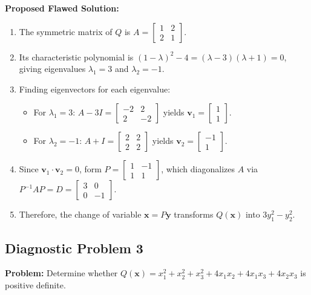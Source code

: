 \documentclass[11pt, letterpaper]{article}
\theoremstyle{definition}
\theoremstyle{remark}
\begin{document}
\textbf{Proposed Flawed Solution:}
\begin{enumerate}
    \item The symmetric matrix of $Q$ is $A = \begin{bmatrix} 1 & 2 \\ 2 & 1 \end{bmatrix}$.
    \item Its characteristic polynomial is $(1-\lambda)^2 - 4 = (\lambda - 3)(\lambda + 1) = 0$, giving eigenvalues $\lambda_1 = 3$ and $\lambda_2 = -1$.
    \item Finding eigenvectors for each eigenvalue:
    \begin{itemize}
        \item For $\lambda_1 = 3$: $A - 3I = \begin{bmatrix} -2 & 2 \\ 2 & -2 \end{bmatrix}$ yields $\mathbf{v}_1 = \begin{bmatrix} 1 \\ 1 \end{bmatrix}$.
        \item For $\lambda_2 = -1$: $A + I = \begin{bmatrix} 2 & 2 \\ 2 & 2 \end{bmatrix}$ yields $\mathbf{v}_2 = \begin{bmatrix} -1 \\ 1 \end{bmatrix}$.
    \end{itemize}
    \item Since $\mathbf{v}_1 \cdot \mathbf{v}_2 = 0$, form $P = \begin{bmatrix} 1 & -1 \\ 1 & 1 \end{bmatrix}$, which diagonalizes $A$ via $P^{-1} A P = D = \begin{bmatrix} 3 & 0 \\ 0 & -1 \end{bmatrix}$.
    \item Therefore, the change of variable $\mathbf{x} = P\mathbf{y}$ transforms $Q(\mathbf{x})$ into $3y_1^2 - y_2^2$.
\end{enumerate}

\hrulefill

\subsection*{Diagnostic Problem 3}
\textbf{Problem:} Determine whether $Q(\mathbf{x}) = x_1^2 + x_2^2 + x_3^2 + 4x_1x_2 + 4x_1x_3 + 4x_2x_3$ is positive definite.
\end{document}
